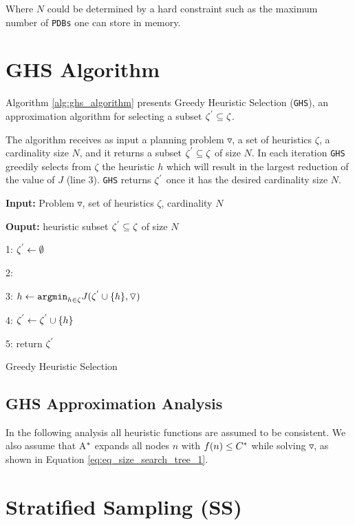 Where $N$ could be determined by a hard constraint such as the maximum number of \texttt{PDBs} one can store in memory.

\section{GHS Algorithm}
\noindent
Algorithm \ref{alg:ghs_algorithm} presents Greedy Heuristic Selection (\texttt{GHS}), an approximation algorithm for selecting a subset $\zeta\sp{'} \subseteq \zeta$.

The algorithm receives as input a planning problem $\triangledown$, a set of heuristics $\zeta$, a cardinality size $N$, and it returns a subset $\zeta\sp{'} \subseteq \zeta$ of size $N$. In each iteration \texttt{GHS} greedily selects from $\zeta$ the heuristic $h$ which will result in the largest reduction of the value of $J$ (line 3). \texttt{GHS} returns $\zeta\sp{'}$ once it has the desired cardinality size $N$.\\

\begin{algorithm}[H]
 
 \textbf{Input:} Problem $\triangledown$, set  of heuristics $\zeta$, cardinality $N$
 
 \textbf{Ouput:} heuristic subset $\zeta\sp{'} \subseteq \zeta$ of size $N$
 
 1:  $\zeta\sp{'} \leftarrow \emptyset$
 
 2:   {
 
 3:  $h \leftarrow \texttt{argmin}_{h \in \zeta} J(\zeta\sp{'} \cup \{h\}, \triangledown) $
 
 4: $\zeta\sp{'} \leftarrow \zeta\sp{'} \cup \{h\}$
 
 5: return $\zeta\sp{'}$
 }
 \caption{Greedy Heuristic Selection}
 \label{alg:ghs_algorithm}
\end{algorithm}

\subsection{GHS Approximation Analysis}
In the following analysis all heuristic functions are assumed to be consistent. We also assume that A$\sp{*}$ expands all nodes $n$ with $f(n) \leq C\sp{*}$ while solving $\triangledown$, as shown in Equation \eqref{eq:eq_size_search_tree_1}.

\section{Stratified Sampling (SS)}


